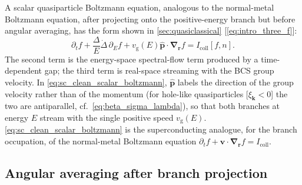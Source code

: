 \documentclass[
  aps,
  prb,
  preprint,
  superscriptaddress,
  longbibliography,
  nofootinbib
]{revtex4-2}
\newcommand{\br}{\mathbf{r}}
\newcommand{\bk}{\mathbf{k}}
\newcommand{\bp}{\mathbf{p}}
\newcommand{\bv}{\mathbf{v}}
\newcommand{\bnabla}{\boldsymbol{\nabla}}
\newcommand{\vg}{v_{\mathrm{g}}}
\newcommand{\Icoll}{I_{\mathrm{coll}}}
\begin{document}
A scalar quasiparticle Boltzmann equation, analogous to the normal-metal Boltzmann equation, after projecting onto the
positive-energy branch but before angular averaging, has the form shown
in \cref{sec:quasiclassical} [\cref{eq:intro_three_f}]:
\begin{equation}
  \partial_t f
  +
  \frac{\Delta}{E}\dot{\Delta}\,\partial_E f
  +
  \vg(E)\hat{\bp}\cdot\bnabla_{\br} f
  =
  \Icoll[f,n].
  \label{eq:sc_clean_scalar_boltzmann}
\end{equation}
The second term is the energy-space spectral-flow term produced by a
time-dependent gap; the third term is real-space streaming with the BCS group
velocity. In \cref{eq:sc_clean_scalar_boltzmann}, \(\hat{\bp}\) labels
the direction of the group velocity rather than of the momentum (for
hole-like quasiparticles [\(\xi_{\bk}<0\)] the two are antiparallel,
cf.~\cref{eq:beta_sigma_lambda}), so that both branches at
energy \(E\) stream with the single positive speed \(\vg(E)\).
\cref{eq:sc_clean_scalar_boltzmann} is the superconducting
analogue, for the branch occupation, of the normal-metal Boltzmann
equation \(\partial_t f+\bv\cdot\bnabla_{\br}f=\Icoll\).

\subsection{Angular averaging after branch projection}
\label{sec:sc_angular_averaging}
\end{document}
